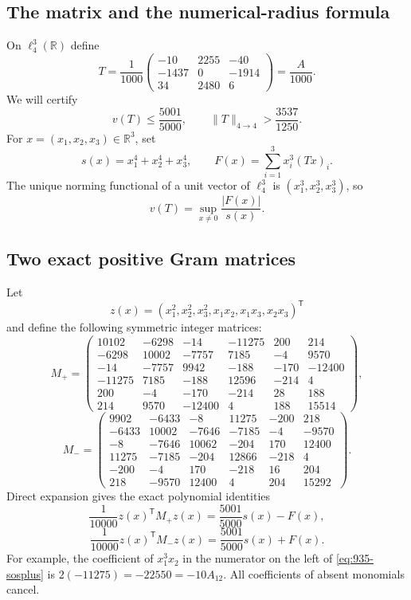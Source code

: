 \documentclass[11pt,a4paper]{article}
\theoremstyle{remark}
\begin{document}
\subsection{The matrix and the numerical-radius formula}

On $\ell_4^3(\mathbb R)$ define
\[
 T=\frac1{1000}
 \begin{pmatrix}
 -10&2255&-40\\
 -1437&0&-1914\\
 34&2480&6
 \end{pmatrix}
 =\frac{A}{1000}.
 \tag{935.1}\label{eq:935-matrix}
\]
We will certify
\[
 v(T)\le\frac{5001}{5000},\qquad
 \|T\|_{4\to4}>\frac{3537}{1250}.
 \tag{935.2}\label{eq:935-bounds}
\]
For $x=(x_1,x_2,x_3)\in\mathbb R^3$, set
\[
 s(x)=x_1^4+x_2^4+x_3^4,
 \qquad F(x)=\sum_{i=1}^3x_i^3(Tx)_i.
\]
The unique norming functional of a unit vector of $\ell_4^3$ is
$(x_1^3,x_2^3,x_3^3)$, so
\[
 v(T)=\sup_{x\ne0}\frac{|F(x)|}{s(x)}.
 \tag{935.3}\label{eq:935-radius}
\]

\subsection{Two exact positive Gram matrices}

Let
\[
 z(x)=(x_1^2,x_2^2,x_3^2,x_1x_2,x_1x_3,x_2x_3)^{\mathsf T}
\]
and define the following symmetric integer matrices:
\[
 M_+=
 \begin{pmatrix}
10102&-6298&-14&-11275&200&214\\
-6298&10002&-7757&7185&-4&9570\\
-14&-7757&9942&-188&-170&-12400\\
-11275&7185&-188&12596&-214&4\\
200&-4&-170&-214&28&188\\
214&9570&-12400&4&188&15514
 \end{pmatrix},
 \tag{935.4}\label{eq:935-plus}
\]
\[
 M_-=
 \begin{pmatrix}
9902&-6433&-8&11275&-200&218\\
-6433&10002&-7646&-7185&-4&-9570\\
-8&-7646&10062&-204&170&12400\\
11275&-7185&-204&12866&-218&4\\
-200&-4&170&-218&16&204\\
218&-9570&12400&4&204&15292
 \end{pmatrix}.
 \tag{935.5}\label{eq:935-minus}
\]
Direct expansion gives the exact polynomial identities
\[
 \frac1{10000}z(x)^{\mathsf T}M_+z(x)
   =\frac{5001}{5000}s(x)-F(x),
 \tag{935.6}\label{eq:935-sosplus}
\]
\[
 \frac1{10000}z(x)^{\mathsf T}M_-z(x)
   =\frac{5001}{5000}s(x)+F(x).
 \tag{935.7}\label{eq:935-sosminus}
\]
For example, the coefficient of $x_1^3x_2$ in the numerator on the left
of \eqref{eq:935-sosplus} is $2(-11275)=-22550=-10A_{12}$.
All coefficients of absent monomials cancel.
\end{document}
